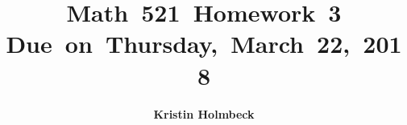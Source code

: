 


\newcommand{\hmwkTitle}{Homework\ 3} %
\newcommand{\hmwkDueDate}{Thursday,\ March\ 22,\ 2018} %
\newcommand{\hmwkClass}{Math\ 521} %
\newcommand{\hmwkAuthorName}{Kristin Holmbeck} %


\title{
\textmd{\textbf{\hmwkClass \ \hmwkTitle}}\\
\normalsize\vspace{0.1in}\small{Due\ on\ \hmwkDueDate}\\
\vspace{0.1in}
\vspace{0.2in}
}

\author{\textbf{\hmwkAuthorName}}
\date{} %




\maketitle


\vspace{0.75in}
\tableofcontents
\listoffigures
\newpage



